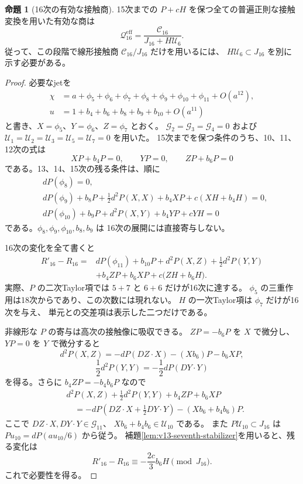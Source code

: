 \documentclass[a4paper,11pt]{ltjsarticle}
\theoremstyle{definition}
\newtheorem{proposition}[theorem]{命題}
\begin{document}
\begin{proposition}[16次の有効な接触商]
\label{prop:v13-effective-contact-sixteen}
15次までの $P+cH$ を保つ全ての普遍正則な接触変換を用いた有効な商は
\begin{equation}\label{eq:v13-effective-sixteen-quotient}
 \boxed{\displaystyle
 \mathcal Q^{\mathrm{eff}}_{16}
 =\frac{\mathcal C_{16}}{J_{16}+H\mathcal U_6}.
 }
\end{equation}
従って、この段階で線形接触商 $\mathcal C_{16}/J_{16}$ だけを用いるには、
$H\mathcal U_6\subset J_{16}$ を別に示す必要がある。
\end{proposition}
\begin{proof}
必要なjetを
\begin{align*}
 \chi&=a+\phi_5+\phi_6+\phi_7+\phi_8+\phi_9
                +\phi_{10}+\phi_{11}+O(a^{12}),\\
 u&=1+b_4+b_6+b_8+b_9+b_{10}+O(a^{11})
\end{align*}
と書き、$X=\phi_5$、$Y=\phi_6$、$Z=\phi_7$ とおく。
$\mathcal G_2=\mathcal G_3=\mathcal G_4=0$ および
$\mathcal U_1=\mathcal U_2=\mathcal U_3=\mathcal U_5=\mathcal U_7=0$
を用いた。
15次までを保つ条件のうち、10、11、12次の式は
\[
 XP+b_4P=0,\qquad YP=0,\qquad ZP+b_6P=0
\]
である。13、14、15次の残る条件は、順に
\begin{align*}
 &dP(\phi_8)=0,\\
 &dP(\phi_9)+b_8P+\frac12d^2P(X,X)+b_4XP
                         +c(XH+b_4H)=0,\\
 &dP(\phi_{10})+b_9P+d^2P(X,Y)+b_4YP+cYH=0
\end{align*}
である。$\phi_8,\phi_9,\phi_{10},b_8,b_9$ は
16次の展開には直接寄与しない。

16次の変化を全て書くと
\begin{align*}
 R'_{16}-R_{16}
 ={}&dP(\phi_{11})+b_{10}P
       +d^2P(X,Z)+\frac12d^2P(Y,Y)\\
    &+b_4ZP+b_6XP+c\bigl(ZH+b_6H\bigr).
\end{align*}
実際、$P$ の二次Taylor項では $5+7$ と $6+6$ だけが16次に達する。
$\phi_5$ の三重作用は18次からであり、この次数には現れない。
$H$ の一次Taylor項は $\phi_7$ だけが16次を与え、
単元との交差項は表示した二つだけである。

非線形な $P$ の寄与は高次の接触像に吸収できる。
$ZP=-b_6P$ を $X$ で微分し、$YP=0$ を $Y$ で微分すると
\[
 d^2P(X,Z)=-dP(DZ\cdot X)-(Xb_6)P-b_6XP,
\]
\[
 \frac12d^2P(Y,Y)=-\frac12dP(DY\cdot Y)
\]
を得る。さらに $b_4ZP=-b_4b_6P$ なので
\begin{align*}
 &d^2P(X,Z)+\frac12d^2P(Y,Y)+b_4ZP+b_6XP\\
 &\hspace{1em}=-dP\left(DZ\cdot X+\frac12DY\cdot Y\right)
               -(Xb_6+b_4b_6)P.
\end{align*}
ここで $DZ\cdot X,DY\cdot Y\in\mathcal G_{11}$、
$Xb_6+b_4b_6\in\mathcal U_{10}$ である。
また $P\mathcal U_{10}\subset J_{16}$ は
$Pu_{10}=dP(au_{10}/6)$ から従う。
補題\ref{lem:v13-seventh-stabilizer}を用いると、残る変化は
\[
 R'_{16}-R_{16}\equiv-\frac{2c}{3}b_6H\pmod{J_{16}}.
\]
これで必要性を得る。


\end{proof}
\end{document}
